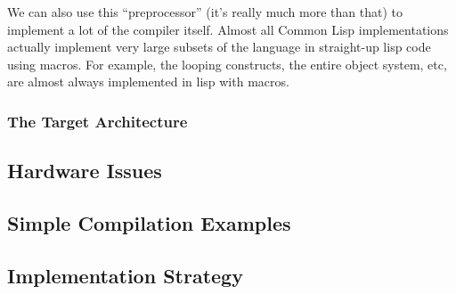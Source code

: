 \documentclass {article}
\begin{document}
We can also use this ``preprocessor'' (it's really much more than
that) to implement a lot of the compiler itself.  Almost all Common
Lisp implementations actually implement very large subsets of the
language in straight-up lisp code using macros.  For example, the
looping constructs, the entire object system, etc, are almost always
implemented in lisp with macros.

\subsubsection{The Target Architecture}
\subsection{Hardware Issues}
\subsection{Simple Compilation Examples}
\subsection{Implementation Strategy}
\end{document}
